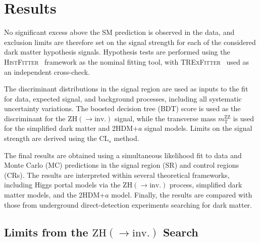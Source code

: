 \section{Results}
\label{sec:monoZ_results}

No significant excess above the SM prediction is observed in the data, and exclusion limits are therefore set on the signal strength for each of the considered dark matter hypothesis signals. Hypothesis tests are performed using the \textsc{HistFitter}~\cite{HistFitter} framework as the nominal fitting tool, with \textsc{TRExFitter}~\cite{TRExFitter} used as an independent cross-check. 

The discriminant distributions in the signal region are used as inputs to the fit for data, expected signal, and background processes, including all systematic uncertainty variations. The boosted decision tree (BDT) score is used as the discriminant for the $\text{ZH}(\to \text{inv.})$ signal, while the transverse mass $m_{\text{T}}^{\text{ZZ}}$ is used for the simplified dark matter and 2HDM+$a$ signal models. Limits on the signal strength are derived using the $\text{CL}_s$ method.

The final results are obtained using a simultaneous likelihood fit to data and Monte Carlo (MC) predictions in the signal region (SR) and control regions (CRs). 
The results are interpreted within several theoretical frameworks, including Higgs portal models via the $\text{ZH}(\to \text{inv.})$ process, simplified dark matter models, and the 2HDM+$a$ model. 
Finally, the results are compared with those from underground direct-detection experiments searching for dark matter.

\subsection{Limits from the $\text{ZH}(\to \text{inv.})$ Search}


